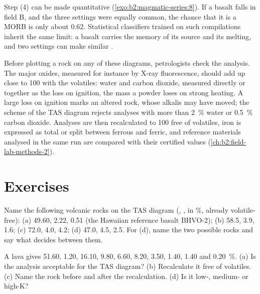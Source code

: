 Step (4) can be made quantitative (\cref{exo:b2:magmatic-series:8}). If a basalt falls in field B, and the
three settings were equally common, the chance that it is a MORB is only about 0.62.
Statistical classifiers trained on such compilations inherit the same limit: a basalt
carries the memory of its source and its melting, and two settings can make similar
.

\begin{inthelab}
Before plotting a rock on any of these diagrams, petrologists check the analysis. The
major oxides, measured for instance by X-ray fluorescence, should add up close to 100
with the volatiles: water and carbon dioxide, measured directly or together as the
loss on ignition, the mass a powder loses on strong heating. A large loss on
ignition marks an altered rock, whose alkalis may have moved; the scheme of the TAS
diagram rejects analyses with more than \qty{2}{\percent} water or
\qty{0.5}{\percent} carbon dioxide. Analyses are then recalculated to 100 free of
volatiles, iron is expressed as total  or split between ferrous and ferric,
and reference materials analysed in the same run are compared with their certified
values (\cref{ch:b2:field-lab-methods-2}).
\end{inthelab}

\section{Exercises}

\begin{exercise}[$\star$]\label{exo:b2:magmatic-series:1}
Name the following volcanic rocks on the TAS diagram (, , 
in \unit{\percent}, already volatile-free): (a) 49.60, 2.22, 0.51 (the Hawaiian
reference basalt BHVO-2); (b) 58.5, 3.9, 1.6; (c) 72.0, 4.0, 4.2; (d) 47.0, 4.5, 2.5.
For (d), name the two possible rocks and say what decides between them.
\end{exercise}

\begin{exercise}[$\star$]\label{exo:b2:magmatic-series:2}
A lava gives  51.60,  1.20,  16.10,  9.80,
 6.60,  8.20,  3.50,  1.40,  1.40 and
 \qty{0.20}{\percent}. (a) Is the analysis acceptable for the TAS diagram?
(b) Recalculate it free of volatiles. (c) Name the rock before and after the
recalculation. (d) Is it low-, medium- or high-K?
\end{exercise}

